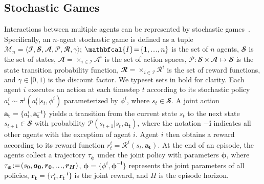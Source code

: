\subsection{Stochastic Games}
Interactions between multiple agents can be represented by stochastic games~\citep{shapley53stochastic}. 
Specifically, an $n$-agent stochastic game is defined as a tuple $\mathcal{M}_{n}\!=\!\langle \mathbfcal{I}, \mathbfcal{S}, \mathbfcal{A}, \mathcal{P}, \mathbfcal{R}, \gamma \rangle$;
$\mathbfcal{I}\!=\!\{1,\sdots,n\}$ is the set of $n$ agents, 
$\mathbfcal{S}$ is the set of states, 
$\mathbfcal{A}\!=\!\times_{i \in \mathcal{I}} \mathcal{A}^{i}$ is the set of action spaces, 
$\mathcal{P}\!:\!\mathbfcal{S}\times\mathbfcal{A}\mapsto \mathbfcal{S}$ is the state transition probability function,
$\mathbfcal{R}\!=\!\times_{i \in \mathcal{I}} \mathcal{R}^{i}$ is the set of reward functions, and
$\gamma\!\in\![0,1)$ is the discount factor.
We typeset sets in bold for clarity.
Each agent $i$ executes an action at each timestep $t$ according to its stochastic policy $a^i_t\!\sim\!\pi^{i}(a^{i}_{t}|s_{t},\phi^i)$ parameterized by $\phi^{i}$, where $s_{t}\!\in\!\mathbfcal{S}$.
A joint action $\bm{a}_{\bm{t}}\!=\!\{a^{i}_t,\bm{a}^{\bm{-i}}_{\bm{t}}\}$ yields a transition from the current state $s_{t}$ to the next state $s_{t+1}\!\in\!\mathbfcal{S}$ with probability $\mathcal{P}(s_{t+1}|s_t,\bm{a}_{\bm{t}})$, where the notation $\bm{-i}$ indicates all other agents with the exception of agent $i$.
Agent $i$ then obtains a reward according to its reward function $r^{i}_t\!=\!\mathcal{R}^i(s_t,\bm{a}_{\bm{t}})$.
At the end of an episode, the agents collect a trajectory $\tau_{\bm{\phi}}$ under the joint policy with parameters $\bm{\phi}$, where $\tau_{\bm{\phi}}\!:=\!(s_{0},\bm{a}_{\bm{0}},\bm{r}_{\bm{0}},\sdots,\bm{r}_{\bm{H}})$, $\bm{\phi}\!=\!\{\phi^{i},\bm{\phi}^{\bm{-i}}\}$ represents the joint parameters of all policies, $\bm{r}_{\bm{t}}\!=\!\{r^{i}_{t},\bm{r}^{\bm{-i}}_{\bm{t}}\}$ is the joint reward, and $H$ is the episode horizon.

